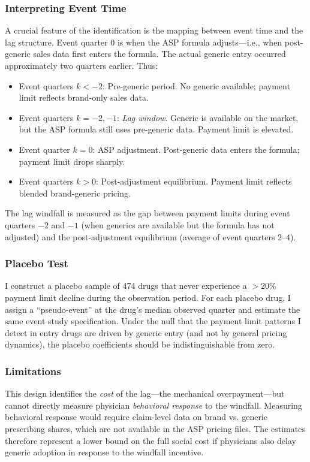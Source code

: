 \documentclass[12pt]{article}
\begin{document}
\subsubsection*{Interpreting Event Time} A crucial feature of the identification is the mapping between event time and the lag structure. Event quarter 0 is when the ASP formula adjusts---i.e., when post-generic sales data first enters the formula. The actual generic entry occurred approximately two quarters earlier. Thus:
\begin{itemize}
\item Event quarters $k < -2$: Pre-generic period. No generic available; payment limit reflects brand-only sales data.
\item Event quarters $k = -2, -1$: \textit{Lag window}. Generic is available on the market, but the ASP formula still uses pre-generic data. Payment limit is elevated.
\item Event quarter $k = 0$: ASP adjustment. Post-generic data enters the formula; payment limit drops sharply.
\item Event quarters $k > 0$: Post-adjustment equilibrium. Payment limit reflects blended brand-generic pricing.
\end{itemize}

The lag windfall is measured as the gap between payment limits during event quarters $-2$ and $-1$ (when generics are available but the formula has not adjusted) and the post-adjustment equilibrium (average of event quarters 2--4).

\subsubsection*{Placebo Test} I construct a placebo sample of 474 drugs that never experience a $>$20\% payment limit decline during the observation period. For each placebo drug, I assign a ``pseudo-event'' at the drug's median observed quarter and estimate the same event study specification. Under the null that the payment limit patterns I detect in entry drugs are driven by generic entry (and not by general pricing dynamics), the placebo coefficients should be indistinguishable from zero.

\subsubsection*{Limitations} This design identifies the \textit{cost} of the lag---the mechanical overpayment---but cannot directly measure physician \textit{behavioral response} to the windfall. Measuring behavioral response would require claim-level data on brand vs. generic prescribing shares, which are not available in the ASP pricing files. The estimates therefore represent a lower bound on the full social cost if physicians also delay generic adoption in response to the windfall incentive.
\end{document}
